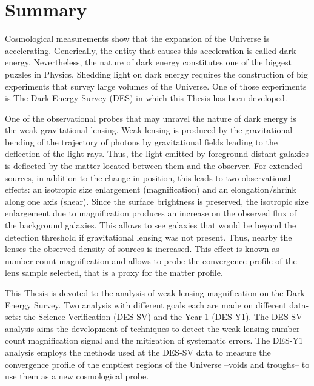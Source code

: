 \chapter*{Summary}
Cosmological measurements show that the expansion of the Universe is accelerating. Generically, the entity that causes this acceleration is called dark energy. Nevertheless, the nature of dark energy constitutes one of the biggest puzzles in Physics. Shedding light on dark energy requires the construction of big experiments that survey large volumes of the Universe. One of those experiments is The Dark Energy Survey (DES) in which this Thesis has been developed.
\newline

One of the observational probes that may unravel the nature of dark energy is the weak gravitational lensing. Weak-lensing is produced by the gravitational bending of the trajectory of photons by gravitational fields leading to the deflection of the light rays. Thus, the light emitted by foreground distant galaxies is deflected by the matter located between them and the observer. For extended sources, in addition to the change in position, this leads to two observational effects: an isotropic size enlargement (magnification) and an elongation/shrink along one axis (shear). Since the surface brightness is preserved, the isotropic size enlargement due to magnification produces an increase on the observed flux of the background galaxies. This allows to see galaxies that would be beyond the detection threshold if gravitational lensing was not present. Thus, nearby the lenses the observed density of sources is increased. This effect is known as number-count magnification and allows to probe the convergence profile of the lens sample selected, that is a proxy for the matter profile.
\newline

This Thesis is devoted to the analysis of weak-lensing magnification on the Dark Energy Survey. Two analysis with different goals each are made on different data-sets: the Science Verification (DES-SV) and the Year 1 (DES-Y1). The DES-SV analysis aims the development of techniques to detect the weak-lensing number count magnification signal and the mitigation of systematic errors. The DES-Y1 analysis employs the methods used at the DES-SV data to measure the convergence profile of the emptiest regions of the Universe --voids and troughs-- to use them as a new cosmological probe.